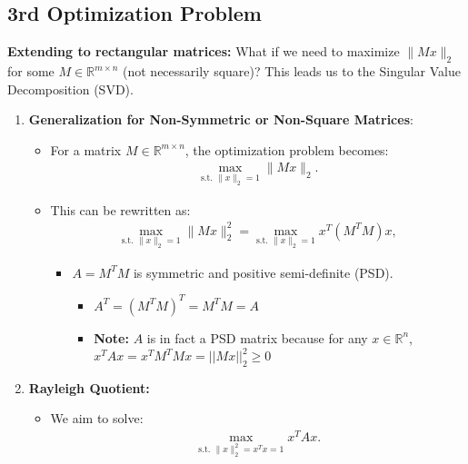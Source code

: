 \subsection{3rd Optimization Problem}
\begin{derivation}
    \textbf{Extending to rectangular matrices:} What if we need to maximize \( \| M x \|_2 \) for some \( M \in \mathbb{R}^{m \times n} \) (not necessarily square)? This leads us to the Singular Value Decomposition (SVD).
    \begin{enumerate}
        \item \textbf{Generalization for Non-Symmetric or Non-Square Matrices}:
            \begin{itemize}
                \item For a matrix $M \in \mathbb{R}^{m \times n}$, the optimization problem becomes:
                    \begin{align*}
                        \max_{\text{s.t. } \|x\|_2 = 1} \|Mx\|_2.
                    \end{align*}
                \item This can be rewritten as:
                    \begin{align*}
                        \max_{\text{s.t. } \|x\|_2 = 1} \|Mx\|_2^2 = \max_{\text{s.t. } \|x\|_2 = 1} x^T (M^T M) x,
                    \end{align*}
                    \begin{itemize}
                        \item $A = M^T M$ is symmetric and positive semi-definite (PSD).
                        \begin{itemize}
                            \item $A^T = (M^T M)^T = M^T M = A$
                            \item \textbf{Note:} $A$ is in fact a PSD matrix because for any $x \in \mathbb{R}^n$, $x^T A x = x^T M^T M x = ||Mx||_2^2 \geq 0$
                        \end{itemize}
                    \end{itemize}
            \end{itemize}
        \item \textbf{Rayleigh Quotient:}
        \begin{itemize}
            \item We aim to solve:
                \begin{align*}
                    \max_{\text{s.t. } \|x\|_2^2 = x^T x=1} x^T A x.

\end{align*}
\end{itemize}
\end{enumerate}
\end{derivation}
